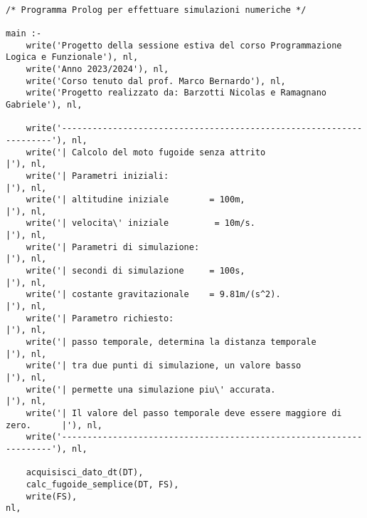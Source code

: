 
\begin{verbatim}
   
/* Programma Prolog per effettuare simulazioni numeriche */

main :-
    write('Progetto della sessione estiva del corso Programmazione Logica e Funzionale'), nl,
    write('Anno 2023/2024'), nl,
    write('Corso tenuto dal prof. Marco Bernardo'), nl,
    write('Progetto realizzato da: Barzotti Nicolas e Ramagnano Gabriele'), nl,

    write('--------------------------------------------------------------------'), nl,
    write('| Calcolo del moto fugoide senza attrito                           |'), nl,
    write('| Parametri iniziali:                                              |'), nl,
    write('| altitudine iniziale        = 100m,                               |'), nl,
    write('| velocita\' iniziale         = 10m/s.                              |'), nl,
    write('| Parametri di simulazione:                                        |'), nl,
    write('| secondi di simulazione     = 100s,                               |'), nl,
    write('| costante gravitazionale    = 9.81m/(s^2).                        |'), nl,
    write('| Parametro richiesto:                                             |'), nl,
    write('| passo temporale, determina la distanza temporale                 |'), nl,
    write('| tra due punti di simulazione, un valore basso                    |'), nl,
    write('| permette una simulazione piu\' accurata.                          |'), nl,
    write('| Il valore del passo temporale deve essere maggiore di zero.      |'), nl,
    write('--------------------------------------------------------------------'), nl,

    acquisisci_dato_dt(DT),                                                        
    calc_fugoide_semplice(DT, FS),
    write(FS),                                                                     nl,


\end{verbatim}
